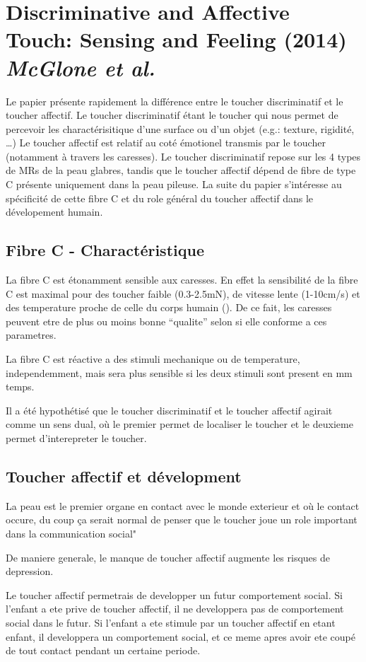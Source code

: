 
\section {Discriminative and Affective Touch: Sensing and Feeling (2014) \textit{McGlone et al.} }
	Le papier pr\'{e}sente rapidement la diff\'{e}rence entre le toucher discriminatif et le toucher affectif.
	Le toucher discriminatif \'{e}tant le toucher qui nous permet de percevoir les charact\'{e}risitique d'une surface ou d'un objet (e.g.: texture, rigidit\'{e}, \ldots)
	Le toucher affectif est relatif au cot\'{e} \'{e}motionel transmis par le toucher (notamment à travers les caresses). 
	Le toucher discriminatif repose sur les 4 types de MRs de la peau glabres, tandis que le toucher affectif d\'{e}pend de fibre de type C pr\'{e}sente uniquement dans la peau pileuse.
	La suite du papier s'int\'{e}resse au sp\'{e}cificit\'{e} de cette fibre C et du role g\'{e}n\'{e}ral du toucher affectif dans le d\'{e}velopement humain.

	\subsection{Fibre C - Charact\'{e}ristique}
		La fibre C est \'{e}tonamment sensible aux caresses.
		En effet la sensibilit\'{e} de la fibre C est maximal pour des toucher faible (0.3-2.5mN), de vitesse lente (1-10cm/s) et des temperature proche de celle du corps humain (). 
		De ce fait, les caresses peuvent etre de plus ou moins bonne ``qualite'' selon si elle conforme a ces parametres.
		
		La fibre C est r\'{e}active a des stimuli mechanique ou de temperature, independemment, mais sera plus sensible si les deux stimuli sont present en mm temps.

		Il a \'{e}t\'{e} hypoth\'{e}tis\'{e} que le toucher discriminatif et le toucher affectif agirait comme un sens dual, où le premier permet de localiser le toucher et le deuxieme permet d'interepreter le toucher.


	\subsection{Toucher affectif et d\'{e}velopment}

	La peau est le premier organe en contact avec le monde exterieur et où le contact occure, du coup ça serait normal de penser que le toucher joue un role important dans la communication social"

	De maniere generale, le manque de toucher affectif augmente les risques de depression.

	Le toucher affectif permetrais de developper un futur comportement social.
	Si l'enfant a ete prive de toucher affectif, il ne developpera pas de comportement social dans le futur.
	Si l'enfant a ete stimule par un toucher affectif en etant enfant, il developpera un comportement social, et ce meme apres avoir ete coup\'{e} de tout contact pendant un certaine periode.


